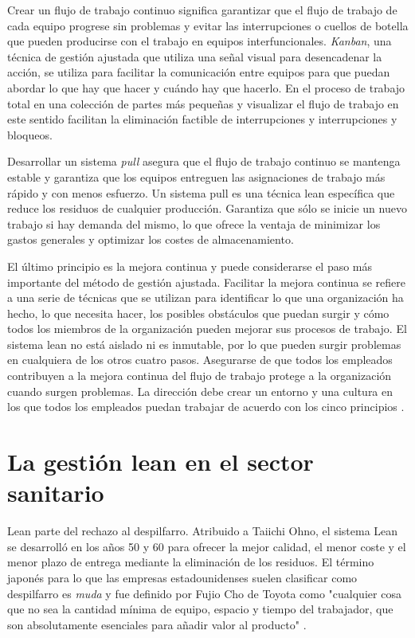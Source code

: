 Crear un flujo de trabajo continuo significa garantizar que el flujo de trabajo de cada equipo progrese sin problemas y evitar las interrupciones o cuellos de botella que pueden producirse con el trabajo en equipos interfuncionales.
\textit{Kanban}, una técnica de gestión ajustada que utiliza una señal visual para desencadenar la acción, se utiliza para facilitar la comunicación entre equipos para que puedan abordar lo que hay que hacer y cuándo hay que hacerlo.
En el proceso de trabajo total en una colección de partes más pequeñas y visualizar el flujo de trabajo en este sentido facilitan la eliminación factible de interrupciones y interrupciones y bloqueos.

Desarrollar un sistema \textit{pull} asegura que el flujo de trabajo continuo se mantenga estable y garantiza que los equipos entreguen las asignaciones de trabajo más rápido y con menos esfuerzo. Un sistema pull es una técnica lean específica que reduce los residuos de cualquier producción. Garantiza que sólo se inicie un nuevo trabajo si hay demanda del mismo, lo que ofrece la ventaja de minimizar los gastos generales y optimizar los costes de almacenamiento.

El último principio es la mejora continua y puede considerarse el paso más importante del método de gestión ajustada.
Facilitar la mejora continua se refiere a una serie de técnicas que se utilizan para identificar lo que una organización ha hecho, lo que necesita hacer, los posibles obstáculos que puedan surgir y cómo todos los miembros de la organización pueden mejorar sus procesos de trabajo.
El sistema lean no está aislado ni es inmutable, por lo que pueden surgir problemas en cualquiera de los otros cuatro pasos.
Asegurarse de que todos los empleados contribuyen a la mejora continua del flujo de trabajo protege a la organización cuando surgen problemas.
La dirección debe crear un entorno y una cultura en los que todos los empleados puedan trabajar de acuerdo con los cinco principios \cite{ohno_toyota_1988,bertagnolli_lean_2018}.

\section{La gestión lean en el sector sanitario}

Lean parte del rechazo al despilfarro. Atribuido a Taiichi Ohno, el sistema Lean se desarrolló en los años 50 y 60 para ofrecer la mejor calidad, el menor coste y el menor plazo de entrega mediante la eliminación de los residuos.
El término japonés para lo que las empresas estadounidenses suelen clasificar como despilfarro es \textit{muda} y fue definido por Fujio Cho de Toyota como "cualquier cosa que no sea la cantidad mínima de equipo, espacio y tiempo del trabajador, que son absolutamente esenciales para añadir valor al producto" \cite{helmold_lean_2020}.

